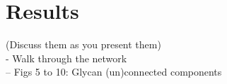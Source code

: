 \documentclass[12pt,a4paper]{article}
\begin{document}





\newpage
\section{Results}
\label{sec:results}
(Discuss them as you present them)\\

- Walk through the network\\
-- Figs 5 to 10: Glycan (un)connected components\\
\end{document}
